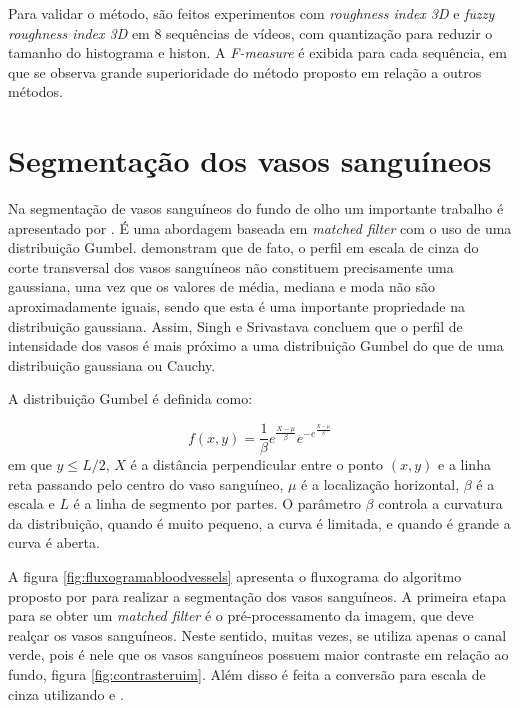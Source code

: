 
Para validar o método, são feitos experimentos com \textit{roughness index 3D} e \textit{fuzzy roughness index 3D} em 8 sequências de vídeos, com quantização para reduzir o tamanho do histograma e histon. A \textit{F-measure} é exibida para cada sequência, em que se observa grande superioridade do método proposto em relação a outros métodos. 



\section{Segmentação dos vasos sanguíneos}
\label{sec:segmentacaovasos}

Na segmentação de vasos sanguíneos do fundo de olho um importante trabalho é apresentado por . É uma abordagem baseada em \textit{matched filter} com o uso de uma distribuição Gumbel.  demonstram que de fato, o perfil em escala de cinza do corte transversal dos vasos sanguíneos não constituem precisamente uma gaussiana, uma vez que os valores de média, mediana e moda não são aproximadamente iguais, sendo que esta é uma importante propriedade na distribuição gaussiana. Assim, Singh e Srivastava concluem que o perfil de intensidade dos vasos é mais próximo a uma distribuição Gumbel do que de uma distribuição gaussiana ou Cauchy. 

A distribuição Gumbel é definida como:

\begin{equation}
f(x,y)=\dfrac{1}{\beta}e^{\frac{X-\mu}{\beta}}e^{-e^{\frac{X-\mu}{\beta}}} \label{eq:gumbel}
\end{equation}
em que $y \leqslant L/2$, $X$ é a distância perpendicular entre o ponto $(x,y)$ e a linha reta passando pelo centro do vaso sanguíneo, $\mu$ é a localização horizontal, $\beta$ é a escala e  $L$ é a linha de segmento por partes. O parâmetro $\beta$ controla a curvatura da distribuição, quando é muito pequeno, a curva é limitada, e quando é grande a curva é aberta. 

A figura \ref{fig:fluxogramabloodvessels} apresenta o fluxograma do algoritmo proposto por  para realizar a segmentação dos vasos sanguíneos. A primeira etapa para se obter um \textit{matched filter} é o pré-processamento da imagem, que deve realçar os vasos sanguíneos. Neste sentido, muitas vezes, se utiliza apenas o canal verde, pois é nele que os vasos sanguíneos possuem maior contraste em relação ao fundo, figura \ref{fig:contrasteruim}. Além disso é feita a conversão para escala de cinza utilizando  e . 

